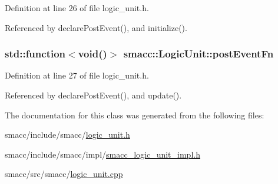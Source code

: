 Definition at line 26 of file logic\+\_\+unit.\+h.



Referenced by declare\+Post\+Event(), and initialize().

\subsubsection[{\texorpdfstring{post\+Event\+Fn}{postEventFn}}]{\setlength{\rightskip}{0pt plus 5cm}std\+::function$<$void()$>$ smacc\+::\+Logic\+Unit\+::post\+Event\+Fn}\hypertarget{classsmacc_1_1LogicUnit_ac75aaeeea0e8d3667763a332ecfd65f7}{}\label{classsmacc_1_1LogicUnit_ac75aaeeea0e8d3667763a332ecfd65f7}


Definition at line 27 of file logic\+\_\+unit.\+h.



Referenced by declare\+Post\+Event(), and update().



The documentation for this class was generated from the following files\+:\begin{DoxyCompactItemize}
\item 
smacc/include/smacc/\hyperlink{logic__unit_8h}{logic\+\_\+unit.\+h}\item 
smacc/include/smacc/impl/\hyperlink{smacc__logic__unit__impl_8h}{smacc\+\_\+logic\+\_\+unit\+\_\+impl.\+h}\item 
smacc/src/smacc/\hyperlink{logic__unit_8cpp}{logic\+\_\+unit.\+cpp}\end{DoxyCompactItemize}
